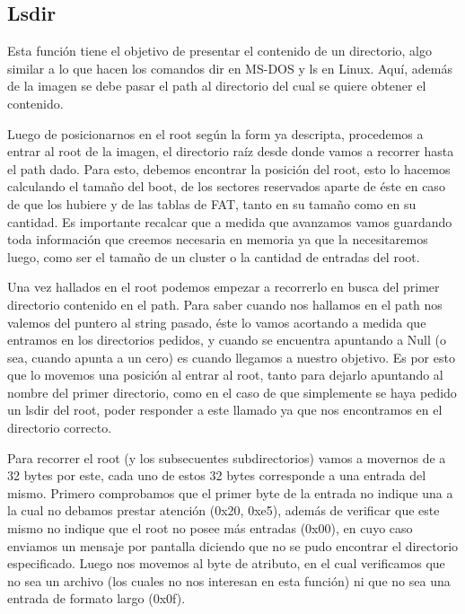\documentclass[a4paper,10pt]{article}
\begin{document}
\subsection{Lsdir}

Esta función tiene el objetivo de presentar el contenido de un directorio, algo similar a lo que hacen los comandos dir en MS-DOS y ls en Linux. Aquí, además de la imagen se debe pasar el path al directorio del cual se quiere obtener el contenido. 

Luego de posicionarnos en el root según la form ya descripta, procedemos a entrar al root de la imagen, el directorio raíz desde donde vamos a recorrer hasta el path dado. Para esto, debemos encontrar la posición del root, esto lo hacemos calculando el tamaño del boot, de los sectores reservados aparte de éste en caso de que los hubiere y de las tablas de FAT, tanto en su tamaño como en su cantidad. Es importante recalcar que a medida que avanzamos vamos guardando toda información que creemos necesaria en memoria ya que la necesitaremos luego, como ser el tamaño de un cluster o la cantidad de entradas del root.

Una vez hallados en el root podemos empezar a recorrerlo en busca del primer directorio contenido en el path. Para saber cuando nos hallamos en el path nos valemos del puntero al string pasado, éste lo vamos acortando a medida que entramos en los directorios pedidos, y cuando se encuentra apuntando a Null (o sea, cuando apunta a un cero) es cuando llegamos a nuestro objetivo. Es por esto que lo movemos una posición al entrar al root, tanto para dejarlo apuntando al nombre del primer directorio, como en el caso de que simplemente se haya pedido un lsdir del root, poder responder a este llamado ya que nos encontramos en el directorio correcto.

Para recorrer el root (y los subsecuentes subdirectorios) vamos a movernos de a 32 bytes por este, cada uno de estos 32 bytes corresponde a una entrada del mismo. Primero comprobamos que el primer byte de la entrada no indique una a la cual no debamos prestar atención (0x20, 0xe5), además de verificar que este mismo no indique que el root no posee más entradas (0x00), en cuyo caso enviamos un mensaje por pantalla diciendo que no se pudo encontrar el directorio especificado. Luego nos movemos al byte de atributo, en el cual verificamos que no sea un archivo (los cuales no nos interesan en esta función) ni que no sea una entrada de formato largo (0x0f). 
\end{document}
